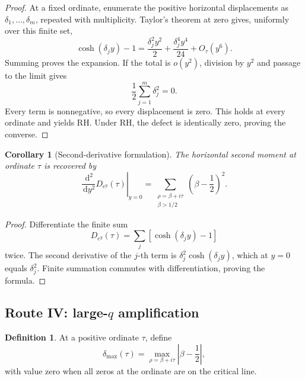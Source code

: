 \documentclass[11pt]{amsart}
\numberwithin{equation}{section}
\theoremstyle{plain}
\newtheorem{corollary}[theorem]{Corollary}
\theoremstyle{definition}
\newtheorem{definition}[theorem]{Definition}
\theoremstyle{remark}
\newcommand{\RH}{\mathrm{RH}}
\newcommand{\1}{\mathbf{1}}
\newcommand{\dd}{\,\mathrm{d}}
\begin{document}
\begin{proof}
At a fixed ordinate, enumerate the positive horizontal displacements as
\(\delta_1,\ldots,\delta_m\), repeated with multiplicity.  Taylor's theorem
at zero gives, uniformly over this finite set,
\begin{equation}
\cosh(\delta_jy)-1
=
\frac{\delta_j^2y^2}{2}
+
\frac{\delta_j^4y^4}{24}
+
O_\tau(y^6).
\label{eq:small_q_taylor_detailed}
\end{equation}
Summing proves the expansion.  If the total is \(o(y^2)\), division by
\(y^2\) and passage to the limit gives
\begin{equation}
\frac12\sum_{j=1}^m\delta_j^2=0.
\label{eq:small_q_sum_squares_zero}
\end{equation}
Every term is nonnegative, so every displacement is zero.  This holds at
every ordinate and yields \(\RH\).  Under \(\RH\), the defect is
identically zero, proving the converse.
\end{proof}

\begin{corollary}[Second-derivative formulation]
\label{cor:small_q_second_derivative}
The horizontal second moment at ordinate \(\tau\) is recovered by
\begin{equation}
\left.\frac{\dd^2}{\dd y^2}D_{e^y}(\tau)\right|_{y=0}
=
\sum_{\substack{\rho=\beta+i\tau\\\beta>1/2}}
\left(\beta-\frac12\right)^2.
\label{eq:small_q_second_derivative}
\end{equation}
\end{corollary}

\begin{proof}
Differentiate the finite sum
\begin{equation}
D_{e^y}(\tau)
=
\sum_j\left[\cosh(\delta_jy)-1\right]
\label{eq:small_q_finite_sum_for_derivative}
\end{equation}
twice.  The second derivative of the \(j\)-th term is
\(\delta_j^2\cosh(\delta_jy)\), which at \(y=0\) equals
\(\delta_j^2\).  Finite summation commutes with differentiation, proving
the formula.
\end{proof}

\subsection{Route IV: large-\(q\) amplification}
\label{subsec:route_large_q}

\begin{definition}
\label{def:max_horizontal_displacement}
At a positive ordinate \(\tau\), define
\begin{equation}
\delta_{\max}(\tau)
=
\max_{\rho=\beta+i\tau}
\left|\beta-\frac12\right|,
\label{eq:max_horizontal_displacement}
\end{equation}
with value zero when all zeros at the ordinate are on the critical line.
\end{definition}
\end{document}
